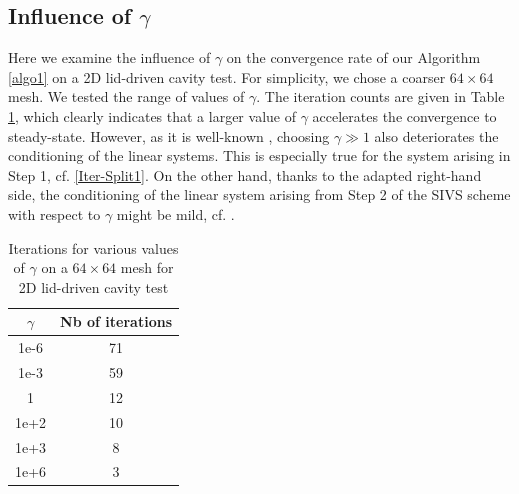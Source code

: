 \documentclass[3p]{elsarticle}
\begin{document}
%
\subsection{Influence of $\gamma$}
Here we examine the influence of $\gamma$ on the convergence rate of our Algorithm \ref{algo1} on a 2D lid-driven cavity test. For simplicity, we chose a coarser $64 \times 64$ mesh. We tested the range of values of $\gamma$. The iteration counts are given in Table \ref{tab:gammaTest}, which clearly indicates that a larger value of $\gamma$ accelerates the convergence to steady-state. However, as it is well-known \cite{BenGolLie2005}, choosing $\gamma \gg 1$ also deteriorates the conditioning of the linear systems. This is especially true for the system arising in Step 1, cf. \eqref{Iter-Split1}. On the other hand, thanks to the adapted right-hand side, the conditioning of the linear system arising from Step 2 of the SIVS scheme with respect to $\gamma$ might be mild, cf. \cite{https://doi.org/10.1002/num.22859,angot2012new}.
 \begin{table}[h!]
     \centering
\begin{tabular}{|c|c|}
\hline
$\gamma$ & \textbf{Nb of iterations} \\ \hline
1e-6 &  71  \\ \hline
1e-3 & 59   \\ \hline
1 &  12  \\ \hline
1e+2 &  10  \\ \hline
1e+3 &  8  \\ \hline
1e+6 &  3  \\ \hline
\end{tabular}
     \caption{Iterations for various values of $\gamma$ on a $64 \times 64$ mesh for 2D lid-driven cavity test}
     \label{tab:gammaTest}
 \end{table}
\end{document}
